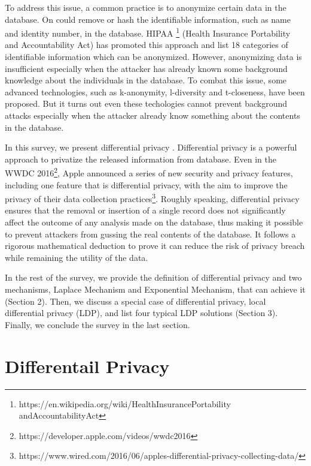 \documentclass[a4paper, 11pt]{article} %
\begin{document}
To address this issue, a common practice is to anonymize certain data in the database. On could remove or hash the identifiable information, such as name and identity number, in the database. HIPAA \footnote{https://en.wikipedia.org/wiki/Health\textunderscore Insurance\textunderscore Portability \textunderscore and\textunderscore Accountability\textunderscore Act}  (Health Insurance Portability and Accountability Act) has promoted this approach and list 18 categories of identifiable information which can be anonymized. However, anonymizing data is insufficient especially when the attacker has already known some background knowledge about the individuals in the database. To combat this issue, some advanced technologies, such as k-anonymity\cite{sweeney2002k}, l-diversity\cite{machanavajjhala2007diversity} and t-closeness\cite{li2007t}, have been proposed. But it turns out even these techologies cannot prevent background attacks especially when the attacker already know something about the contents in the database\cite{ji2014differential}.

In this survey, we present differential privacy\cite{dwork2008differential, dwork2014algorithmic} . Differential privacy is a powerful approach to privatize the released information from database. Even in the WWDC 2016\footnote{https://developer.apple.com/videos/wwdc2016}, Apple announced a series of new security and privacy features, including one feature that is differential privacy, with the aim to improve the privacy of their data collection practices\footnote{https://www.wired.com/2016/06/apples-differential-privacy-collecting-data/}. Roughly speaking, differential privacy ensures that the removal or insertion of a single record does not significantly affect the outcome of any analysis made on the database, thus making it possible to prevent attackers from gussing the real contents of the database. It follows a rigorous mathematical deduction to prove it can reduce the risk of privacy breach while remaining the utility of the data.

In the rest of the survey, we provide the definition of differential privacy and two mechanisms, Laplace Mechanism and Exponential Mechanism, that can achieve it (Section 2). Then, we discuss a special case of differential privacy, local differential privacy (LDP), and list four typical LDP solutions (Section 3). Finally, we conclude the survey in the last section.



\section{Differentail Privacy}
\end{document}
